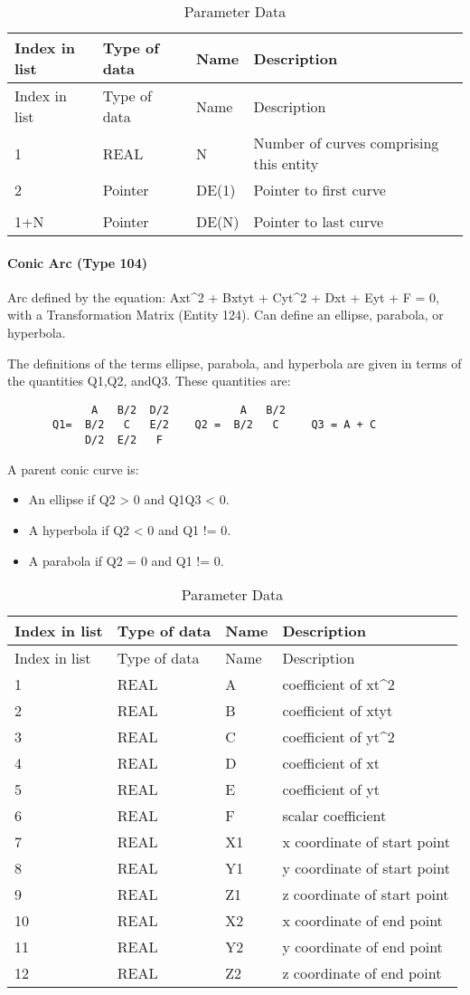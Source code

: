 \begin{longtable}[c]{@{}llll@{}}
\caption{Parameter Data}\tabularnewline
\toprule
Index in list & Type of data & Name & Description\tabularnewline
\midrule
\endfirsthead
\toprule
Index in list & Type of data & Name & Description\tabularnewline
\midrule
\endhead
1 & REAL & N & Number of curves comprising this entity\tabularnewline
2 & Pointer & DE(1) & Pointer to first curve\tabularnewline
\vtop{\hbox{\strut .}\hbox{\strut .}} &
\vtop{\hbox{\strut .}\hbox{\strut .}} &
\vtop{\hbox{\strut .}\hbox{\strut .}} &\tabularnewline
1+N & Pointer & DE(N) & Pointer to last curve\tabularnewline
\bottomrule
\end{longtable}

\paragraph{Conic Arc (Type 104)}\label{conic-arc-type-104}

Arc defined by the equation: Axt\^{}2 + Bxtyt + Cyt\^{}2 + Dxt + Eyt + F
= 0, with a Transformation Matrix (Entity 124). Can define an ellipse,
parabola, or hyperbola.

The definitions of the terms ellipse, parabola, and hyperbola are given
in terms of the quantities Q1,Q2, andQ3. These quantities are:

\texttt{~~~~~~~~~~~\textbar{}~~A~~~B/2~~D/2~\textbar{}~~~~~~~~\textbar{}~~A~~~B/2~\textbar{}~}\\\texttt{~~~~~~~Q1=~\textbar{}~B/2~~~C~~~E/2~\textbar{}~~~Q2~=~\textbar{}~B/2~~~C~~\textbar{}~~~Q3~=~A~+~C~}\\\texttt{~~~~~~~~~~~\textbar{}~D/2~~E/2~~~F~~\textbar{}~}

A parent conic curve is:

\begin{itemize}
\itemsep1pt\parskip0pt
\item
  An ellipse if Q2 \textgreater{} 0 and Q1Q3 \textless{} 0.
\item
  A hyperbola if Q2 \textless{} 0 and Q1 != 0.
\item
  A parabola if Q2 = 0 and Q1 != 0.
\end{itemize}

\begin{longtable}[c]{@{}llll@{}}
\caption{Parameter Data}\tabularnewline
\toprule
Index in list & Type of data & Name & Description\tabularnewline
\midrule
\endfirsthead
\toprule
Index in list & Type of data & Name & Description\tabularnewline
\midrule
\endhead
1 & REAL & A & coefficient of xt\^{}2\tabularnewline
2 & REAL & B & coefficient of xtyt\tabularnewline
3 & REAL & C & coefficient of yt\^{}2\tabularnewline
4 & REAL & D & coefficient of xt\tabularnewline
5 & REAL & E & coefficient of yt\tabularnewline
6 & REAL & F & scalar coefficient\tabularnewline
7 & REAL & X1 & x coordinate of start point\tabularnewline
8 & REAL & Y1 & y coordinate of start point\tabularnewline
9 & REAL & Z1 & z coordinate of start point\tabularnewline
10 & REAL & X2 & x coordinate of end point\tabularnewline
11 & REAL & Y2 & y coordinate of end point\tabularnewline
12 & REAL & Z2 & z coordinate of end point\tabularnewline
\bottomrule
\end{longtable}

